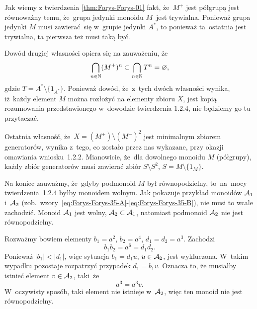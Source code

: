 \documentclass[a4paper,11pt]{article}
\begin{document}
Jak wiemy z twierdzenia \eqref{thm:Forys-Forys-01} fakt, że~$M^{ + }$ jest
półgrupą jest równoważny temu, że~grupa jedynki monoidu $M$~jest trywialna.
Ponieważ grupa jedynki $M$ musi zawierać~się w~grupie jedynki $A^{ * }$, to
ponieważ ta~ostatnia jest trywialna, ta pierwsza też musi taką być.

Dowód drugiej własności opiera się na zauważeniu, że
\begin{equation}
  \label{eq:Forys-Forys-66}
  \bigcap_{ n \in \mathbb{N} } ( M^{ + } )^{ n } \subset \bigcap_{ n \in \mathbb{N} } T^{ n } = \varnothing,
\end{equation}
gdzie $T = A^{ * } \setminus \{ 1_{ A^{ * } } \}$. Ponieważ dowód, że~z~tych dwóch
własności wynika, iż~każdy element $M$ można rozłożyć na elementy zbioru
$X$, jest kopią rozumowania przedstawionego w~dowodzie twierdzenia 1.2.4,
nie będziemy go tu przytaczać.

Ostatnia własność, że~$X = ( M^{ + } ) \setminus ( M^{ + } )^{ 2 }$ jest minimalnym
zbiorem generatorów, wynika z~tego, co zostało przez nas wykazane, przy
okazji omawiania wniosku~1.2.2. Mianowicie, że~dla dowolnego monoidu $M$
(półgrupy), każdy zbiór generatorów musi zawierać zbiór $S \setminus S^{ 2 }$,
$S = M \setminus \{ 1_{ M } \}$.

Na koniec zauważmy, że~gdyby podmonoid $M$ był równopodzielny, to~na~mocy
twierdzenia~1.2.4 byłby monoidem wolnym. Jak pokazuje przykład monoidów
$\mathcal{A}_{ 1 }$ i~$\mathcal{A}_{ 2 }$
(zob.~wzory~\eqref{eq:Forys-Forys-35-A}-\eqref{eq:Forys-Forys-35-B}),
nie musi to wcale zachodzić. Monoid $\mathcal{A}_{ 1 }$ jest wolny,
$\mathcal{A}_{ 2 } \subset \mathcal{A}_{ 1 }$, natomiast podmonoid $\mathcal{A}_{ 2 }$ nie jest
równopodzielny.

Rozważmy bowiem elementy $b_{ 1 } = a^{ 2 }$, $b_{ 2 } = a^{ 4 }$,
$d_{ 1 } = d_{ 2 } = a^{ 3 }$. Zachodzi
\begin{equation}
  \label{eq:3}
  b_{ 1 } b_{ 2 } = a^{ 6 } = d_{ 1 } d_{ 2 }.
\end{equation}
Ponieważ $| b_{ 1 } | < | d_{ 1 } |$, więc sytuacja $b_{ 1 } = d_{ 1 } u$,
$u \in \mathcal{A}_{ 2 }$, jest wykluczona. W~takim wypadku pozostaje rozpatrzyć
przypadek $d_{ 1 } = b_{ 1 } v$. Oznacza to, że musiałby istnieć element
$v \in \mathcal{A}_{ 2 }$, taki~że
\begin{equation}
  \label{eq:2}
  a^{ 3 } = a^{ 3 } v.
\end{equation}
W~oczywisty sposób, taki element nie istnieje w~$\mathcal{A}_{ 2 }$, więc ten
monoid nie jest równopodzielny.

\vspace{\spaceFour}
\end{document}
